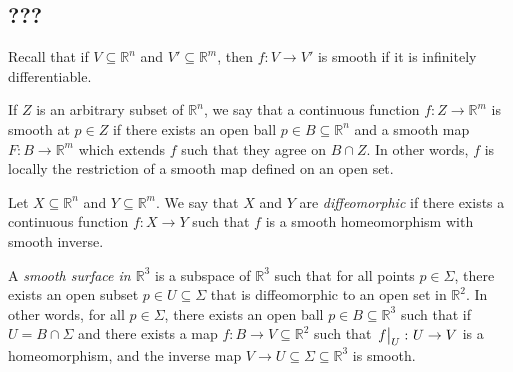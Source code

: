 \subsection{???}
Recall that if \( V \subseteq \mathbb R^n \) and \( V' \subseteq \mathbb R^m \), then \( f \colon V \to V' \) is smooth if it is infinitely differentiable.
\begin{definition}
	If \( Z \) is an arbitrary subset of \( \mathbb R^n \), we say that a continuous function \( f \colon Z \to \mathbb R^m \) is smooth at \( p \in Z \) if there exists an open ball \( p \in B \subseteq \mathbb R^n \) and a smooth map \( F \colon B \to \mathbb R^m \) which extends \( f \) such that they agree on \( B \cap Z \).
	In other words, \( f \) is locally the restriction of a smooth map defined on an open set.
\end{definition}
\begin{definition}
	Let \( X \subseteq \mathbb R^n \) and \( Y \subseteq \mathbb R^m \).
	We say that \( X \) and \( Y \) are \textit{diffeomorphic} if there exists a continuous function \( f \colon X \to Y \) such that \( f \) is a smooth homeomorphism with smooth inverse.
\end{definition}
\begin{definition}
	A \textit{smooth surface in \( \mathbb R^3 \)} is a subspace of \( \mathbb R^3 \) such that for all points \( p \in \Sigma \), there exists an open subset \( p \in U \subseteq \Sigma \) that is diffeomorphic to an open set in \( \mathbb R^2 \).
	In other words, for all \( p \in \Sigma \), there exists an open ball \( p \in B \subseteq \mathbb R^3 \) such that if \( U = B \cap \Sigma \) and there exists a map \( f \colon B \to V \subseteq \mathbb R^2 \) such that \( \eval{f}_U \colon U \to V \) is a homeomorphism, and the inverse map \( V \to U \subseteq \Sigma \subseteq \mathbb R^3 \) is smooth.
\end{definition}

